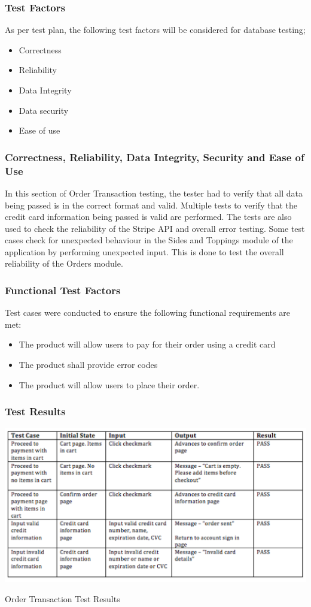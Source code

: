 \documentclass[12pt, titlepage]{article}
\begin{document}
\subsubsection{Test Factors}
As per test plan, the following test factors will be considered for database testing;
\begin{itemize}
 \item Correctness
 \item Reliability
 \item Data Integrity
 \item Data security
 \item Ease of use
 \end{itemize}
\subsubsection{Correctness, Reliability, Data Integrity, Security and Ease of Use}
In this section of Order Transaction testing, the tester had to verify that all data being passed is in the correct format and valid. Multiple tests to verify that the credit card information being passed is valid are performed. The tests are also used to check the reliability of the Stripe API and overall error testing. Some test cases check for unexpected behaviour in the Sides and Toppings module of the application by performing unexpected input. This is done to test the overall reliability of the Orders module.    

 \subsubsection{Functional Test Factors}
Test cases were conducted to ensure the following functional requirements are met:
\begin{itemize}
 \item The product will allow users to pay for their order using a credit card
 \item The product shall provide error codes
 \item The product will allow users to place their order.
 \end{itemize}

\subsubsection{Test Results}
\break
\begin{table}[h]
\includegraphics[width=1.2\textwidth]{orderTransactionTC.png}
  \caption{Order Transaction Test Results}
\end{table}
\end{document}
